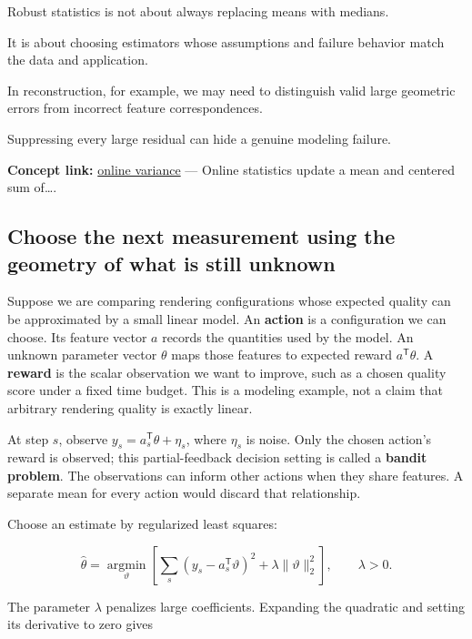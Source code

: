 Robust statistics is not about always replacing means with medians.

It is about choosing estimators whose assumptions and failure behavior match the data and application.

In reconstruction, for example, we may need to distinguish valid large geometric errors from incorrect feature correspondences.

Suppressing every large residual can hide a genuine modeling failure.

\textbf{Concept link:} \hyperref[02-foundations-ii-ch030-finite-samples-need-stable-descriptive-statistics]{online variance} --- Online statistics update a mean and centered sum of\ldots.

\subsection{Choose the next measurement using the geometry of what is still unknown}\label{02-foundations-ii-ch030-choose-the-next-measurement-using-the-geometry-of-what-is-still-unknown}

\hypertarget{02-foundations-ii-ch030-choose-the-next-measurement-using-the-geometry-of-what-is-still-unknown}{}

Suppose we are comparing rendering configurations whose expected quality can be approximated by a small linear model. An \textbf{action} is a configuration we can choose. Its feature vector \(a\) records the quantities used by the model. An unknown parameter vector \(\theta\) maps those features to expected reward \(a^{\mathsf T}\theta\). A \textbf{reward} is the scalar observation we want to improve, such as a chosen quality score under a fixed time budget. This is a modeling example, not a claim that arbitrary rendering quality is exactly linear.

At step \(s\), observe \(y_s=a_s^{\mathsf T}\theta+\eta_s\), where \(\eta_s\) is noise. Only the chosen action's reward is observed; this partial-feedback decision setting is called a \textbf{bandit problem}. The observations can inform other actions when they share features. A separate mean for every action would discard that relationship.

Choose an estimate by regularized least squares:

\[
\widehat\theta=\underset{\vartheta}{\operatorname{argmin}}
\left[\sum_s(y_s-a_s^{\mathsf T}\vartheta)^2
+\lambda\|\vartheta\|_2^2\right],\qquad\lambda>0.
\]

The parameter \(\lambda\) penalizes large coefficients. Expanding the quadratic and setting its derivative to zero gives

